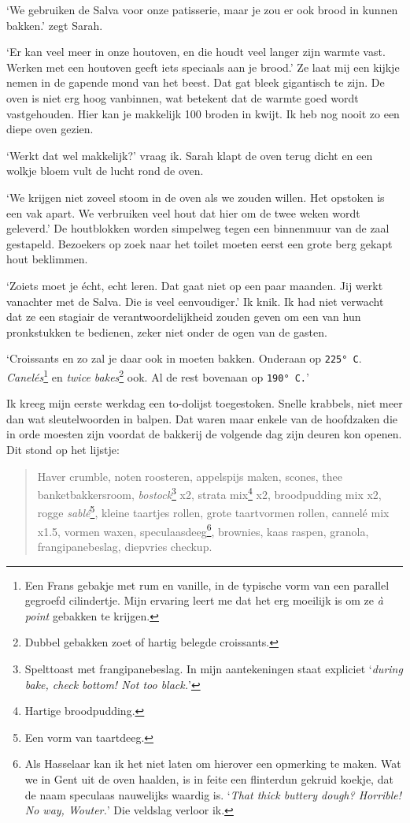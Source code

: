 \documentclass[
  11pt,
  dutch,
]{memoir}
\begin{document}
`We gebruiken de Salva voor onze patisserie, maar je zou er ook brood in
kunnen bakken.' zegt Sarah.

`Er kan veel meer in onze houtoven, en die houdt veel langer zijn warmte
vast. Werken met een houtoven geeft iets speciaals aan je brood.' Ze
laat mij een kijkje nemen in de gapende mond van het beest. Dat gat
bleek gigantisch te zijn. De oven is niet erg hoog vanbinnen, wat
betekent dat de warmte goed wordt vastgehouden. Hier kan je makkelijk
100 broden in kwijt. Ik heb nog nooit zo een diepe oven gezien.

`Werkt dat wel makkelijk?' vraag ik. Sarah klapt de oven terug dicht en
een wolkje bloem vult de lucht rond de oven.

`We krijgen niet zoveel stoom in de oven als we zouden willen. Het
opstoken is een vak apart. We verbruiken veel hout dat hier om de twee
weken wordt geleverd.' De houtblokken worden simpelweg tegen een
binnenmuur van de zaal gestapeld. Bezoekers op zoek naar het toilet
moeten eerst een grote berg gekapt hout beklimmen.

`Zoiets moet je écht, echt leren. Dat gaat niet op een paar maanden. Jij
werkt vanachter met de Salva. Die is veel eenvoudiger.' Ik knik. Ik had
niet verwacht dat ze een stagiair de verantwoordelijkheid zouden geven
om een van hun pronkstukken te bedienen, zeker niet onder de ogen van de
gasten.

`Croissants en zo zal je daar ook in moeten bakken. Onderaan op
\texttt{225°\ C}. \emph{Canelés}\footnote{Een Frans gebakje met rum en
  vanille, in de typische vorm van een parallel gegroefd cilindertje.
  Mijn ervaring leert me dat het erg moeilijk is om ze \emph{à point}
  gebakken te krijgen.} en \emph{twice bakes}\footnote{Dubbel gebakken
  zoet of hartig belegde croissants.} ook. Al de rest bovenaan op
\texttt{190°\ C.}'

Ik kreeg mijn eerste werkdag een to-dolijst toegestoken. Snelle
krabbels, niet meer dan wat sleutelwoorden in balpen. Dat waren maar
enkele van de hoofdzaken die in orde moesten zijn voordat de bakkerij de
volgende dag zijn deuren kon openen. Dit stond op het lijstje:

\begin{quote}
Haver crumble, noten roosteren, appelspijs maken, scones, thee
banketbakkersroom, \emph{bostock}\footnote{Spelttoast met
  frangipanebeslag. In mijn aantekeningen staat expliciet `\emph{during
  bake, check bottom! Not too black.}'} x2, strata mix\footnote{Hartige
  broodpudding.} x2, broodpudding mix x2, rogge \emph{sablé}\footnote{Een
  vorm van taartdeeg.}, kleine taartjes rollen, grote taartvormen
rollen, cannelé mix x1.5, vormen waxen, speculaasdeeg\footnote{Als
  Hasselaar kan ik het niet laten om hierover een opmerking te maken.
  Wat we in Gent uit de oven haalden, is in feite een flinterdun gekruid
  koekje, dat de naam speculaas nauwelijks waardig is. `\emph{That thick
  buttery dough? Horrible! No way, Wouter.}' Die veldslag verloor ik.},
brownies, kaas raspen, granola, frangipanebeslag, diepvries checkup.
\end{quote}
\end{document}
